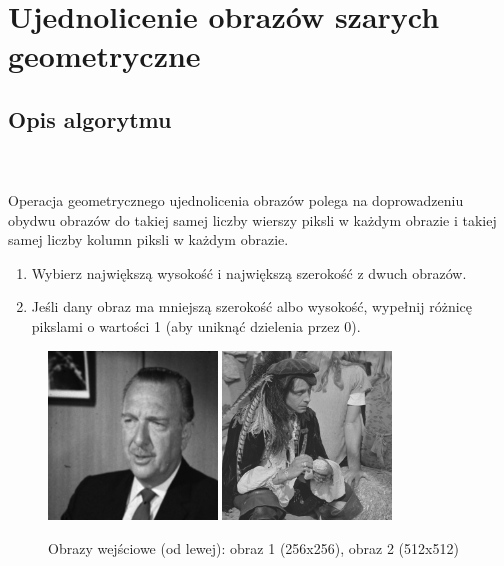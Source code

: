 \documentclass[final,a4paper,openany,12pt]{mwbk}
\begin{document}
\section{Ujednolicenie obrazów szarych geometryczne}
\subsection*{Opis algorytmu}
\hfill
\\\\
\indent Operacja geometrycznego ujednolicenia obrazów polega na doprowadzeniu obydwu obrazów do takiej samej liczby wierszy piksli w każdym obrazie i takiej samej liczby kolumn piksli w każdym obrazie.
\begin{enumerate}
	\item Wybierz największą wysokość i największą szerokość z dwuch obrazów.\\
	\item Jeśli dany obraz ma mniejszą szerokość albo wysokość, wypełnij różnicę pikslami o wartości 1 (aby uniknąć dzielenia przez 0).
\end{enumerate}

\begin{figure}[H]
	\begin{center}
		\includegraphics[width=0.4\textwidth]{gentelman_gray}
		\includegraphics[width=0.4\textwidth]{pirate_gray}
	\end{center}
	\caption{Obrazy wejściowe (od lewej): obraz 1 (256x256), obraz 2 (512x512)}
\end{figure}
\end{document}
